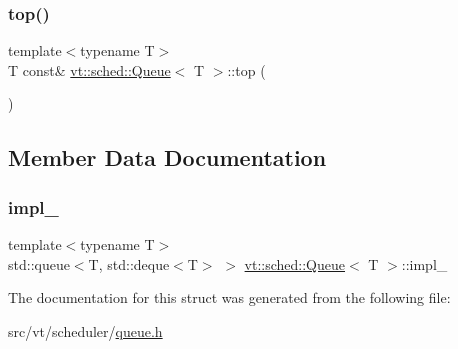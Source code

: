 \mbox{\label{structvt_1_1sched_1_1_queue_a636c676d2dc99d283ba3607e7ed5b390}} 
\subsubsection{\texorpdfstring{top()}{top()}}
{\footnotesize\ttfamily template$<$typename T$>$ \\
T const\& \hyperlink{structvt_1_1sched_1_1_queue}{vt\+::sched\+::\+Queue}$<$ T $>$\+::top (\begin{DoxyParamCaption}{ }\end{DoxyParamCaption})\hspace{0.3cm}{\ttfamily [inline]}}



\subsection{Member Data Documentation}
\mbox{\label{structvt_1_1sched_1_1_queue_a68cbe05570c230c55b730d8e98a1f6a5}} 
\subsubsection{\texorpdfstring{impl\+\_\+}{impl\_}}
{\footnotesize\ttfamily template$<$typename T$>$ \\
std\+::queue$<$T, std\+::deque$<$T$>$ $>$ \hyperlink{structvt_1_1sched_1_1_queue}{vt\+::sched\+::\+Queue}$<$ T $>$\+::impl\+\_\+\hspace{0.3cm}{\ttfamily [private]}}



The documentation for this struct was generated from the following file\+:\begin{DoxyCompactItemize}
\item 
src/vt/scheduler/\hyperlink{queue_8h}{queue.\+h}\end{DoxyCompactItemize}
